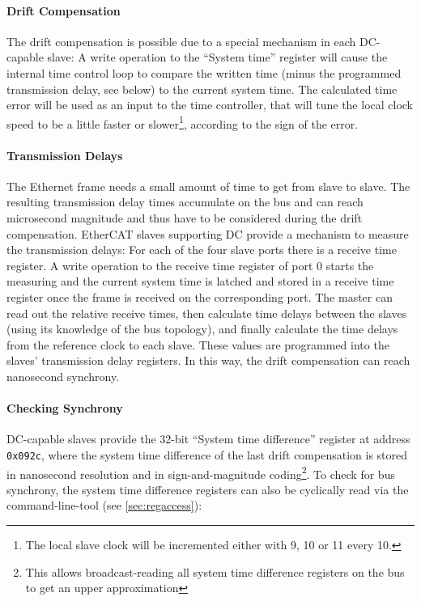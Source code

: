 \documentclass[a4paper,12pt,BCOR=6mm,bibtotoc,idxtotoc]{scrbook}
\begin{document}
\paragraph{Drift Compensation} The drift compensation is possible due to a
special mechanism in each DC-capable slave: A write operation to the ``System
time'' register will cause the internal time control loop to compare the
written time (minus the programmed transmission delay, see below) to the
current system time. The calculated time error will be used as an input to the
time controller, that will tune the local clock speed to be a little faster or
slower\footnote{The local slave clock will be incremented either with
\unit{9}{\nano\second}, \unit{10}{\nano\second} or \unit{11}{\nano\second}
every \unit{10}{\nano\second}.}, according to the sign of the error.

\paragraph{Transmission Delays} The Ethernet frame needs a small amount of
time to get from slave to slave. The resulting transmission delay times
accumulate on the bus and can reach microsecond magnitude and thus have to be
considered during the drift compensation. EtherCAT slaves supporting DC
provide a mechanism to measure the transmission delays: For each of the four
slave ports there is a receive time register. A write operation to the receive
time register of port 0 starts the measuring and the current system time is
latched and stored in a receive time register once the frame is received on
the corresponding port. The master can read out the relative receive times,
then calculate time delays between the slaves (using its knowledge of the bus
topology), and finally calculate the time delays from the reference clock to
each slave. These values are programmed into the slaves' transmission delay
registers. In this way, the drift compensation can reach nanosecond synchrony.

\paragraph{Checking Synchrony} DC-capable slaves provide the 32-bit ``System
time difference'' register at address \lstinline+0x092c+, where the system
time difference of the last drift compensation is stored in nanosecond
resolution and in sign-and-magnitude coding\footnote{This allows
broadcast-reading all system time difference registers on the bus to get an
upper approximation}. To check for bus synchrony, the system time difference
registers can also be cyclically read via the command-line-tool (see
\autoref{sec:regaccess}):
\end{document}
